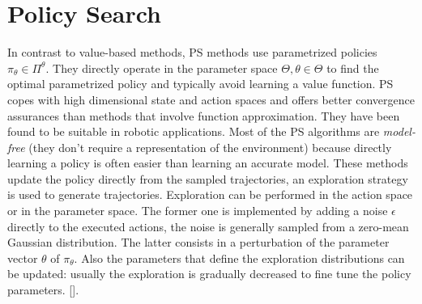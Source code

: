\section{Policy Search}\label{sec:ps}
In contrast to value-based methods, \acf{PS} methods use parametrized policies $\pi_{\theta} \in \Pi^{\theta}$. They directly operate in the parameter space $\Theta, \theta \in \Theta$ to find the optimal parametrized policy and typically avoid learning a value function. \ac{PS} copes with high dimensional state and action spaces and offers better convergence assurances than methods that involve function approximation. They have been found to be suitable in robotic applications. Most of the \ac{PS} algorithms are \emph{model-free} (\ie they don't require a representation of the environment) because directly learning a policy is often easier than learning an accurate model. These methods update the policy directly from the sampled trajectories, an exploration strategy is used to generate trajectories. Exploration can be performed in the action space or in the parameter space. The former one is implemented by adding a noise $\epsilon$ directly to the executed actions, the noise is generally sampled from a zero-mean Gaussian distribution. The latter consists in a perturbation of the parameter vector $\theta$ of $\pi_{\theta}$. Also the parameters that define the exploration distributions can be updated: usually the exploration is gradually decreased to fine tune the policy parameters. [\citet{deisenroth2013Survey}].

